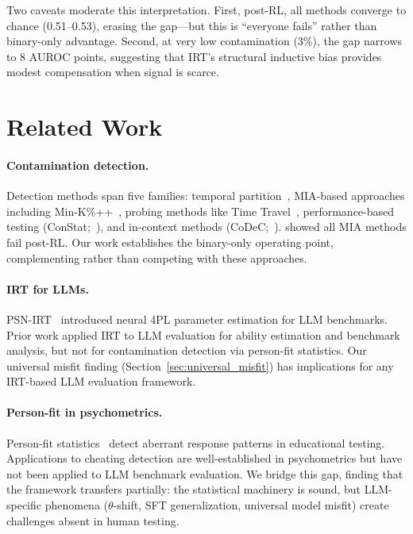 \documentclass[11pt,a4paper]{article}
\begin{document}
Two caveats moderate this interpretation.
First, post-RL, all methods converge to chance (0.51--0.53), erasing the gap---but this is ``everyone fails'' rather than binary-only advantage.
Second, at very low contamination (3\%), the gap narrows to 8 AUROC points, suggesting that IRT's structural inductive bias provides modest compensation when signal is scarce.

\section{Related Work}

\paragraph{Contamination detection.}
Detection methods span five families: temporal partition~\citep{dodge2021documenting}, MIA-based approaches including Min-K\%++~\citep{shi2024detecting}, probing methods like Time Travel~\citep{dong2024generalization}, performance-based testing (ConStat;~\citealp{dekoninck2024constat}), and in-context methods (CoDeC;~\citealp{codec2026}).
\citet{wang2025rlcontam} showed all MIA methods fail post-RL.
Our work establishes the binary-only operating point, complementing rather than competing with these approaches.

\paragraph{IRT for LLMs.}
PSN-IRT~\citep{psnirt2026} introduced neural 4PL parameter estimation for LLM benchmarks.
Prior work applied IRT to LLM evaluation for ability estimation and benchmark analysis, but not for contamination detection via person-fit statistics.
Our universal misfit finding (Section~\ref{sec:universal_misfit}) has implications for any IRT-based LLM evaluation framework.

\paragraph{Person-fit in psychometrics.}
Person-fit statistics~\citep{meijer2001,snijders2001} detect aberrant response patterns in educational testing.
Applications to cheating detection are well-established in psychometrics but have not been applied to LLM benchmark evaluation.
We bridge this gap, finding that the framework transfers partially: the statistical machinery is sound, but LLM-specific phenomena ($\theta$-shift, SFT generalization, universal model misfit) create challenges absent in human testing.
\end{document}
